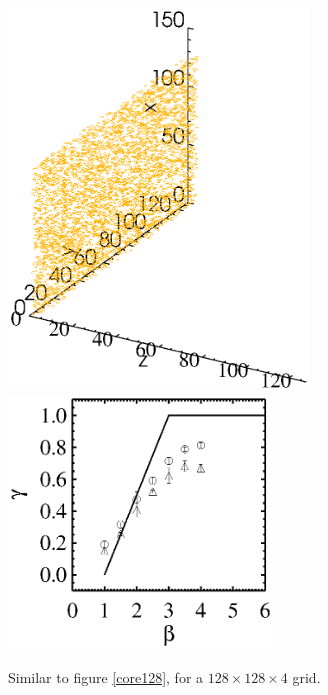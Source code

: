 \documentclass[iop,revtex4]{emulateapj}
\begin{document}
\begin{figure}[htbp]
\includegraphics[width=8cm]{fft_simu_plot_core4.eps} \includegraphics[width=7cm]{beta_gamma4.eps}
\caption{ Similar to figure \ref{core128}, for a $128\times 128\times 4$ grid.
\label{core4}}
\end{figure}
\end{document}
